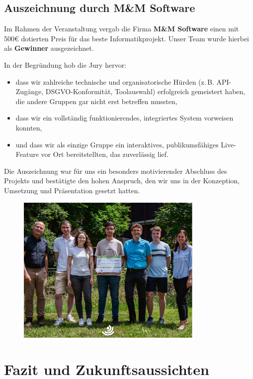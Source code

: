 \documentclass[a4paper,12pt]{article}
\begin{document}
\subsection{Auszeichnung durch M\&M Software}

Im Rahmen der Veranstaltung vergab die Firma \textbf{M\&M Software} einen mit 500€ dotierten Preis für das beste Informatikprojekt. Unser Team wurde hierbei als \textbf{Gewinner} ausgezeichnet.

In der Begründung hob die Jury hervor:

\begin{itemize}
    \item dass wir zahlreiche technische und organisatorische Hürden (z.\,B. API-Zugänge, DSGVO-Konformität, Toolauswahl) erfolgreich gemeistert haben, die andere Gruppen gar nicht erst betreffen mussten,
    \item dass wir ein vollständig funktionierendes, integriertes System vorweisen konnten,
    \item und dass wir als einzige Gruppe ein interaktives, publikumsfähiges Live-Feature vor Ort bereitstellten, das zuverlässig lief.
\end{itemize}

Die Auszeichnung war für uns ein besonders motivierender Abschluss des Projekts und bestätigte den hohen Anspruch, den wir uns in der Konzeption, Umsetzung und Präsentation gesetzt hatten.

\begin{figure}[h] %
  \centering
  \includegraphics[width=0.8\textwidth]{images/Untitled-1.png}
\end{figure}

\section{Fazit und Zukunftsaussichten}
\end{document}
